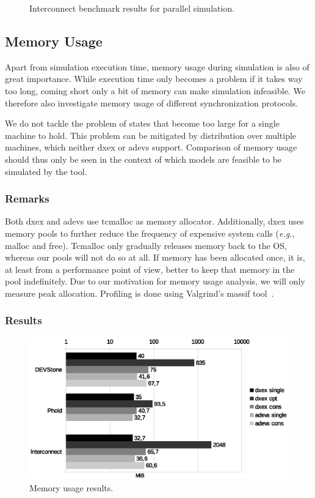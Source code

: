 \begin{figure}
    \caption{Interconnect benchmark results for parallel simulation.}
    \label{fig:interconnect_benchmark_parallel}
\end{figure}

\subsection{Memory Usage}
Apart from simulation execution time, memory usage during simulation is also of great importance.
While execution time only becomes a problem if it takes way too long, coming short only a bit of memory can make simulation infeasible.
We therefore also investigate memory usage of different synchronization protocols.

We do not tackle the problem of states that become too large for a single machine to hold.
This problem can be mitigated by distribution over multiple machines, which neither dxex or adevs support.
Comparison of memory usage should thus only be seen in the context of which models are feasible to be simulated by the tool.

\subsubsection{Remarks}
Both dxex and adevs use tcmalloc as memory allocator.
Additionally, dxex uses memory pools to further reduce the frequency of expensive system calls (\textit{e.g.}, malloc and free).
Tcmalloc only gradually releases memory back to the OS, whereas our pools will not do so at all.
If memory has been allocated once, it is, at least from a performance point of view, better to keep that memory in the pool indefinitely.
Due to our motivation for memory usage analysis, we will only measure peak allocation.
Profiling is done using Valgrind's massif tool~\cite{Nethercote:2007:VFH:1273442.1250746}.

\subsubsection{Results}
\begin{figure}
    \includegraphics[width=\columnwidth]{fig/memory_voorlopig.eps}
    \caption{Memory usage results.}
    \label{fig:memory}
\end{figure}

